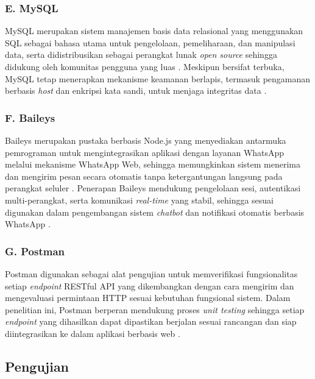 \subsubsection*{E. MySQL} \label{II.MySQL}
MySQL merupakan sistem manajemen basis data relasional yang menggunakan SQL sebagai bahasa utama untuk pengelolaan, pemeliharaan, dan manipulasi data, serta didistribusikan sebagai perangkat lunak \textit{open source} sehingga didukung oleh komunitas pengguna yang luas \cite{gyorodi2021mysql}. Meskipun bersifat terbuka, MySQL tetap menerapkan mekanisme keamanan berlapis, termasuk pengamanan berbasis \textit{host} dan enkripsi kata sandi, untuk menjaga integritas data \cite{gyorodi2021mysql}. \par

\subsubsection*{F. Baileys} \label{II.Baileys}
Baileys merupakan pustaka berbasis Node.js yang menyediakan antarmuka pemrograman untuk mengintegrasikan aplikasi dengan layanan WhatsApp melalui mekanisme WhatsApp Web, sehingga memungkinkan sistem menerima dan mengirim pesan secara otomatis tanpa ketergantungan langsung pada perangkat seluler \cite{erawan2025baileys}. Penerapan Baileys mendukung pengelolaan sesi, autentikasi multi-perangkat, serta komunikasi \textit{real-time} yang stabil, sehingga sesuai digunakan dalam pengembangan sistem \textit{chatbot} dan notifikasi otomatis berbasis WhatsApp \cite{erawan2025baileys}. \par

\subsubsection*{G. Postman} \label{II.Postman}
Postman digunakan sebagai alat pengujian untuk memverifikasi fungsionalitas setiap \textit{endpoint} RESTful API yang dikembangkan dengan cara mengirim dan mengevaluasi permintaan HTTP sesuai kebutuhan fungsional sistem. Dalam penelitian ini, Postman berperan mendukung proses \textit{unit testing} sehingga setiap \textit{endpoint} yang dihasilkan dapat dipastikan berjalan sesuai rancangan dan siap diintegrasikan ke dalam aplikasi berbasis web \cite{tri2022postman}. \par

\subsection{Pengujian} \label{II.Pengujian}


